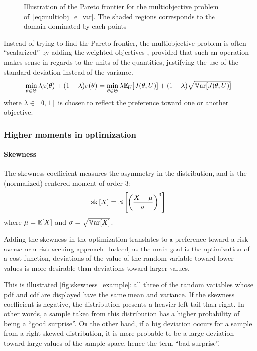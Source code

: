 \documentclass[../../Main_ManuscritThese.tex]{subfiles}
\newcommand\imgpath{/home/victor/acadwriting/Manuscrit/Text/Chapter3/img/}
\begin{document}
\begin{figure}[ht]
  \label{fig:pareto} 
  \centering
  
  \caption{Illustration of the Pareto frontier for the multiobjective problem of~\cref{eq:multiobj_e_var}. The shaded regions corresponds to the domain dominated by each points}
\end{figure}

Instead of trying to find the Pareto frontier, the multiobjective problem is often ``scalarized'' by adding the weighted objectives \cite{marler_weighted_2010}, provided that such an operation makes sense in regards to the units of the quantities, justifying the use of the standard deviation instead of the variance.
\begin{equation}
  \min_{\theta\in\Theta} \lambda \mu(\theta) + (1- \lambda)\sigma(\theta) =   \min_{\theta\in\Theta} \lambda \mathbb{E}_{U}[J(\theta,U)] + (1- \lambda)\sqrt{\mathbb{V}\mathrm{ar}[J(\theta,U)]}
\end{equation}
where $\lambda \in [0,1]$ is chosen to reflect the preference toward one or another objective.

\subsubsection{Higher moments in optimization}

\paragraph{Skewness}
The skewness coefficient measures the asymmetry in the distribution, and is the (normalized) centered moment of order $3$:
\begin{equation}
  \mathrm{sk}\left[X\right] = \mathbb{E}\left[\left(\frac{X - \mu}{\sigma}\right)^3\right]
\end{equation}
where $\mu = \mathbb{E}[X]$ and $\sigma = \sqrt{\mathbb{V}\mathrm{ar}[X]}$.

Adding the skewness in the optimization translates to a preference toward a risk-averse or a risk-seeking approach. Indeed, as the main goal is the optimization of a cost function, deviations of the value of the random variable toward lower values is more desirable than deviations toward larger values.

This is illustrated \cref{fig:skewness_example}: all three of the random variables whose pdf and cdf are displayed have the same mean and variance.
If the skewness coefficient is negative, the distribution presents a heavier left tail than right. In other words, a sample taken from this distribution has a higher probability of being a ``good surprise''. On the other hand, if a big deviation occurs for a sample from a right-skewed distribution, it is more probable to be a large deviation toward large values of the sample space, hence the term ``bad surprise''.
\end{document}
